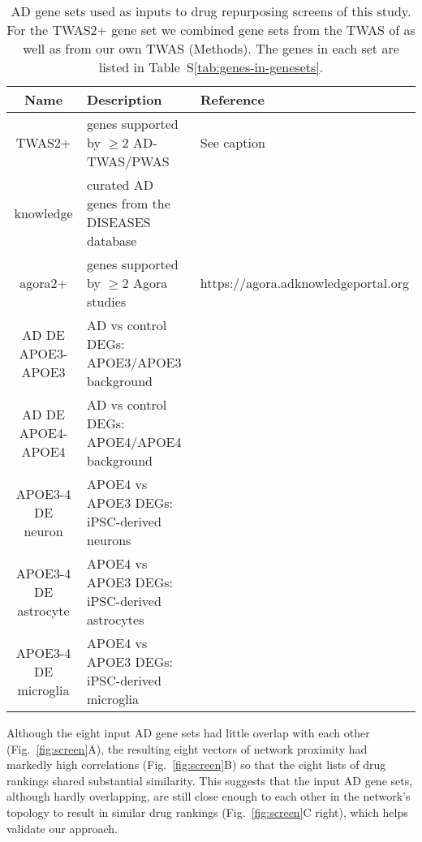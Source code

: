 \documentclass[letterpaper]{article}
\begin{document}
\begin{table}
\footnotesize
\begin{tabular}{cll}
Name     & Description & Reference  \\
\hline
TWAS2+   & genes supported by $\ge 2$ AD-TWAS/PWAS & See caption  \\
knowledge& curated AD genes from the DISEASES database & \cite{PletscherFrankild2015} \\
agora2+  & genes supported by $\ge 2$ Agora studies & https://agora.adknowledgeportal.org \\
AD DE APOE3-APOE3 & AD vs control DEGs: APOE3/APOE3 background & \cite{Taubes2021} \\
AD DE APOE4-APOE4 & AD vs control DEGs: APOE4/APOE4 background & \cite{Taubes2021} \\
APOE3-4 DE neuron & APOE4 vs APOE3 DEGs: iPSC-derived neurons& \cite{Lin2018} \\
APOE3-4 DE astrocyte & APOE4 vs APOE3 DEGs: iPSC-derived astrocytes& \cite{Lin2018} \\
APOE3-4 DE microglia & APOE4 vs APOE3 DEGs: iPSC-derived microglia& \cite{Lin2018} \\
\end{tabular}
\caption{
AD gene sets used as inputs to drug repurposing screens of this study.  For
the TWAS2+ gene set we combined gene sets from the TWAS of
\cite{Gerring2020,Baird2021,Jansen2019,Kunkle2019,Wingo2021,Schwartzentruber2021}
as well as from our own TWAS (Methods).  The genes in each set are listed in
Table~S\ref{tab:genes-in-genesets}.
}
\label{tab:genesets}
\end{table}

Although the eight input AD gene sets had little overlap with each other
(Fig.~\ref{fig:screen}A), the resulting eight vectors of network proximity had
markedly high correlations (Fig.~\ref{fig:screen}B) so that the eight lists
of drug rankings shared substantial similarity.  This suggests that the
input AD gene sets, although hardly overlapping, are still close enough to
each other in the network's topology to result in similar drug rankings
(Fig.~\ref{fig:screen}C right), which helps validate our approach.
\end{document}
